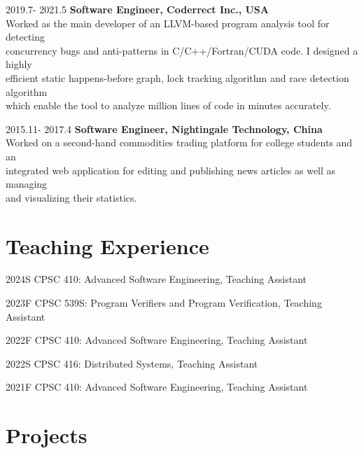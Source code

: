 \documentclass[12pt,letterpaper]{report}
\newcommand{\listtabwidth}{1.75cm}
\begin{document}
\begin{tablist}[style=multiline, leftmargin=*]
	\item[2019.7- 2021.5]
	\tab \textbf{Software Engineer, Coderrect Inc., USA}\\
	\tab Worked as the main developer of an LLVM-based program analysis tool for detecting\\
	\tab concurrency bugs and anti-patterns in C/C++/Fortran/CUDA code. I designed a highly\\
	\tab efficient static happens-before graph, lock tracking algorithm and race detection algorithm\\
	\tab which enable the tool to analyze million lines of code in minutes accurately.
	\item[2015.11- 2017.4]
	\tab \textbf{Software Engineer, Nightingale Technology, China}\\
	\tab Worked on a second-hand commodities trading platform for college students and an\\
	\tab integrated web application for editing and publishing news articles as well as managing\\
	\tab and visualizing their statistics.
\end{tablist}

\section*{Teaching Experience}
\begin{tablist}
	\item[2024S] \tab CPSC 410: Advanced Software Engineering, Teaching Assistant
	\item[2023F] \tab CPSC 539S: Program Verifiers and Program Verification, Teaching Assistant
	\item[2022F] \tab CPSC 410: Advanced Software Engineering, Teaching Assistant
	\item[2022S] \tab CPSC 416: Distributed Systems, Teaching Assistant
	\item[2021F] \tab CPSC 410: Advanced Software Engineering, Teaching Assistant
\end{tablist}

\vspace{-0.5em}

\renewcommand{\listtabwidth}{2.8cm}
\section*{Projects}
\end{document}
